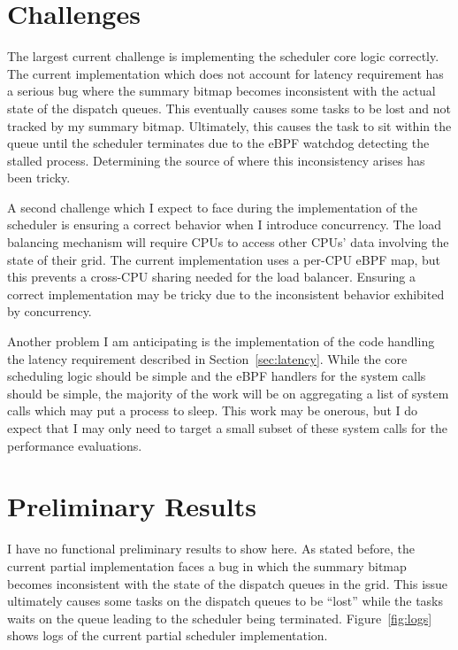 \documentclass[letterpaper,twocolumn,10pt]{article}
\begin{document}
\section{Challenges}

The largest current challenge is implementing the scheduler core logic
correctly. The current implementation which does not account for latency
requirement has a serious bug where the summary bitmap becomes inconsistent
with the actual state of the dispatch queues. This eventually causes some tasks
to be lost and not tracked by my summary bitmap. Ultimately, this causes the
task to sit within the queue until the scheduler terminates due to the
eBPF watchdog detecting the stalled process. Determining the source of where this
inconsistency arises has been tricky. 

A second challenge which I expect to face during the implementation of the scheduler
is ensuring a correct behavior when I introduce concurrency. The load balancing
mechanism will require CPUs to access other CPUs' data involving the state of their
grid. The current implementation uses a per-CPU eBPF map, but this prevents a
cross-CPU sharing needed for the load balancer. Ensuring a correct implementation
may be tricky due to the inconsistent behavior exhibited by concurrency.

Another problem I am anticipating is the implementation of the code handling
the latency requirement described in Section~\ref{sec:latency}. While the
core scheduling logic should be simple and the eBPF handlers for the system
calls should be simple, the majority of the work will be on aggregating
a list of system calls which may put a process to sleep. This work may be
onerous, but I do expect that I may only need to target a small subset
of these system calls for the performance evaluations.

\section{Preliminary Results}

I have no functional preliminary results to show here. As stated before, the
current partial implementation faces a bug in which the summary bitmap becomes
inconsistent with the state of the dispatch queues in the grid. This issue
ultimately causes some tasks on the dispatch queues to be ``lost'' while the
tasks waits on the queue leading to the scheduler being terminated. 
Figure~\ref{fig:logs} shows logs of the current partial scheduler implementation.
\end{document}
